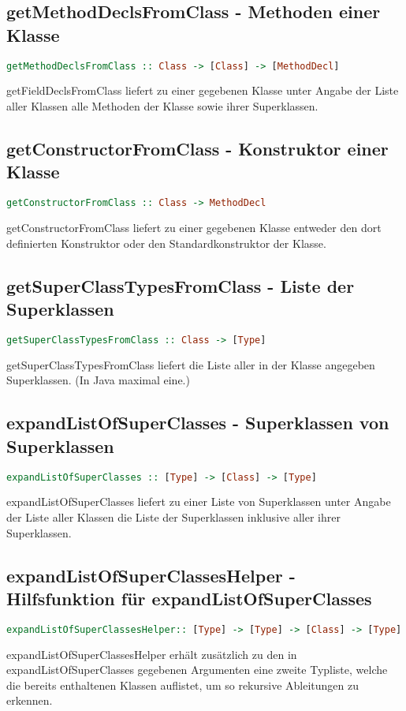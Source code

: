 \documentclass[a4paper,10pt]{article}
\begin{document}
\subsection{getMethodDeclsFromClass - Methoden einer Klasse}
\begin{lstlisting}[language=Haskell]
getMethodDeclsFromClass :: Class -> [Class] -> [MethodDecl]
\end{lstlisting}
getFieldDeclsFromClass liefert zu einer gegebenen Klasse unter Angabe der Liste aller Klassen alle Methoden der Klasse sowie ihrer Superklassen.
\\
\subsection{getConstructorFromClass - Konstruktor einer Klasse}
\begin{lstlisting}[language=Haskell]
getConstructorFromClass :: Class -> MethodDecl
\end{lstlisting}
getConstructorFromClass liefert zu einer gegebenen Klasse entweder den dort definierten Konstruktor oder den Standardkonstruktor der Klasse.
\\
\subsection{getSuperClassTypesFromClass - Liste der Superklassen}
\begin{lstlisting}[language=Haskell]
getSuperClassTypesFromClass :: Class -> [Type]
\end{lstlisting}
getSuperClassTypesFromClass liefert die Liste aller in der Klasse angegeben Superklassen. (In Java maximal eine.)
\\
\subsection{expandListOfSuperClasses - Superklassen von Superklassen}
\begin{lstlisting}[language=Haskell]
expandListOfSuperClasses :: [Type] -> [Class] -> [Type]
\end{lstlisting}
expandListOfSuperClasses liefert zu einer Liste von Superklassen unter Angabe der Liste aller Klassen die Liste der Superklassen inklusive aller ihrer Superklassen.
\\
\subsection{expandListOfSuperClassesHelper - Hilfsfunktion für expandListOfSuperClasses}
\begin{lstlisting}[language=Haskell]
expandListOfSuperClassesHelper:: [Type] -> [Type] -> [Class] -> [Type]
\end{lstlisting}
expandListOfSuperClassesHelper erhält zusätzlich zu den in expandListOfSuperClasses gegebenen Argumenten eine zweite Typliste, welche die bereits enthaltenen Klassen auflistet,
um so rekursive Ableitungen zu erkennen.
\\
\end{document}

